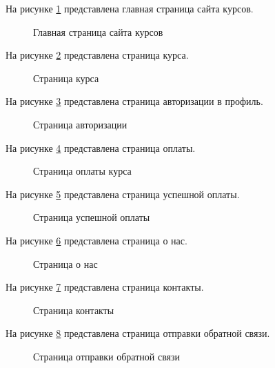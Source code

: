На рисунке \ref{main:image} представлена главная страница сайта курсов.
\newpage %
\begin{figure}[H] %
	\caption{Главная страница сайта курсов}
	\label{main:image}
\end{figure}

На рисунке \ref{menu:image} представлена страница курса.

\begin{figure}[ht]
	\caption{Страница курса}
	\label{menu:image}
\end{figure}

\newpage
На рисунке \ref{enter:image} представлена страница авторизации в профиль.

\begin{figure}[ht]
	\caption{Страница авторизации}
	\label{enter:image}
\end{figure}

На рисунке \ref{pay:image} представлена страница оплаты.

\begin{figure}[ht]
	\caption{Страница оплаты курса}
	\label{pay:image}
\end{figure}

\newpage
На рисунке \ref{getpay:image} представлена страница успешной оплаты.

\begin{figure}[ht]
	\caption{Страница успешной оплаты}
	\label{getpay:image}
\end{figure}


На рисунке \ref{about:image} представлена страница о нас.

\begin{figure}[ht]
	\caption{Страница о нас}
	\label{about:image}
\end{figure}

\newpage
На рисунке \ref{contact:image} представлена страница контакты.

\begin{figure}[ht]
	\caption{Страница контакты}
	\label{contact:image}
\end{figure}

На рисунке \ref{mess:image} представлена страница отправки обратной связи.

\begin{figure}[ht]
	\caption{Страница отправки обратной связи}
	\label{mess:image}
\end{figure}

